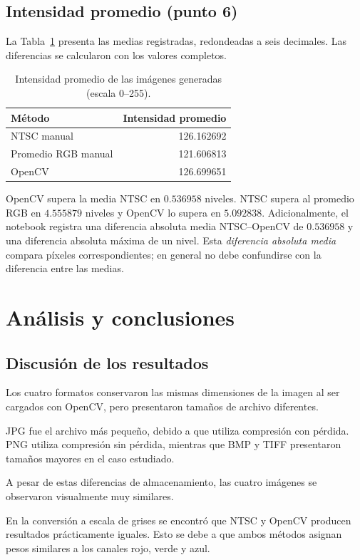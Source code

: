 \documentclass[11pt,a4paper]{article}
\begin{document}
\subsection{Intensidad promedio (punto 6)}
La Tabla~\ref{tab:brillo} presenta las medias registradas, redondeadas
a seis decimales. Las diferencias se calcularon con los valores completos.
\begin{table}[htbp]
\centering
\caption{Intensidad promedio de las im\'agenes generadas (escala 0--255).}
\label{tab:brillo}
\begin{tabular}{lr}
\toprule
M\'etodo & Intensidad promedio\\
\midrule
NTSC manual & 126.162692\\
Promedio RGB manual & 121.606813\\
OpenCV & 126.699651\\
\bottomrule
\end{tabular}
\end{table}
OpenCV supera la media NTSC en $0.536958$ niveles. NTSC supera al
promedio RGB en $4.555879$ niveles y OpenCV lo supera en $5.092838$.
Adicionalmente, el notebook registra una diferencia absoluta media
NTSC--OpenCV de $0.536958$ y una diferencia absoluta m\'axima de un nivel.
Esta \textit{diferencia absoluta media} compara p\'ixeles correspondientes;
en general no debe confundirse con la diferencia entre las medias.

\section{An\'alisis y conclusiones}
\subsection{Discusión de los resultados}

Los cuatro formatos conservaron las mismas dimensiones de la imagen al ser
cargados con OpenCV, pero presentaron tamaños de archivo diferentes.

JPG fue el archivo más pequeño, debido a que utiliza compresión con pérdida.
PNG utiliza compresión sin pérdida, mientras que BMP y TIFF presentaron
tamaños mayores en el caso estudiado.

A pesar de estas diferencias de almacenamiento, las cuatro imágenes se
observaron visualmente muy similares.

En la conversión a escala de grises se encontró que NTSC y OpenCV producen
resultados prácticamente iguales. Esto se debe a que ambos métodos asignan
pesos similares a los canales rojo, verde y azul.
\end{document}
